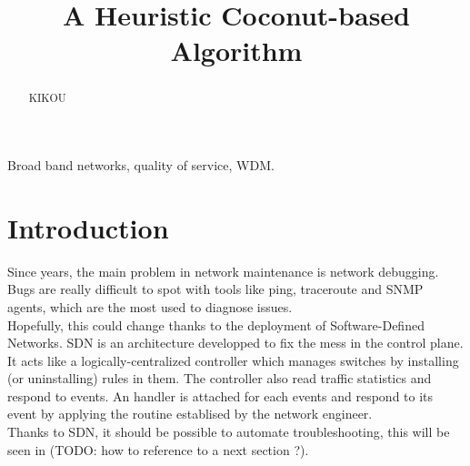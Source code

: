 \documentclass[10pt,article]{IEEEtran}
\begin{document}
\title{A Heuristic Coconut-based Algorithm}


\maketitle
\begin{abstract}
KIKOU
\end{abstract}

\begin{IEEEkeywords}
Broad band networks, quality of service, WDM.
\end{IEEEkeywords}

\section{Introduction}

Since years, the main problem in network maintenance is network debugging. Bugs are really difficult to spot with tools like ping, traceroute and SNMP agents, which are the most used to diagnose issues. \cite{...}\\ %
Hopefully, this could change thanks to the deployment of Software-Defined Networks. SDN is an architecture developped to fix the mess in the control plane. It acts like a logically-centralized controller which manages switches by installing (or uninstalling) rules in them. The controller also read traffic statistics and respond to events. An handler is attached for each events and respond to its event by applying the routine establised by the network engineer. \\
Thanks to SDN, it should be possible to automate troubleshooting, this will be seen in (TODO: how to reference to a next section ?).
\end{document}
